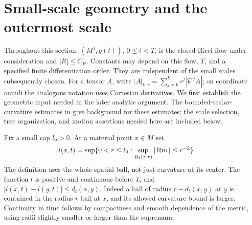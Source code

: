 \section{Small-scale geometry and the outermost scale}\label{sec:geometry}

Throughout this section, $(M^4,g(t))$, $0\leq t<T$, is the closed
Ricci flow under consideration and $|R|\leq C_R$. Constants may depend
on this flow, $T$, and a specified finite differentiation order. They are
independent of the small scales subsequently chosen. For a tensor $A$,
write $|A|_{k,r}=\sum_{j=0}^k r^j|\nabla^j A|$; on coordinate annuli
the analogous notation uses Cartesian derivatives. We first establish
the geometric input needed in the later analytic argument. The
bounded-scalar-curvature estimates in
\cite{BamlerZhangI,BamlerZhangII} give background for these estimates;
the scale selection, tree organization, and motion assertions needed
here are included below.

\begin{definition}\label{geom:radius}
Fix a small cap $l_0>0$. At a material point $x\in M$ set
\[
 l(x,t)=\sup\{0<r\leq l_0:
       \sup_{B_t(x,r)}|\operatorname{Rm}|\leq r^{-2}\}.
\]
The definition uses the whole spatial ball, not just curvature at its
center. The function $l$ is positive and continuous before $T$, and
$|l(x,t)-l(y,t)|\leq d_t(x,y)$. Indeed a ball of radius $r-d_t(x,y)$
at $y$ is contained in the radius-$r$ ball at $x$, and its allowed
curvature bound is larger. Continuity in time follows by compactness
and smooth dependence of the metric, using radii slightly smaller or
larger than the supremum.
\end{definition}

